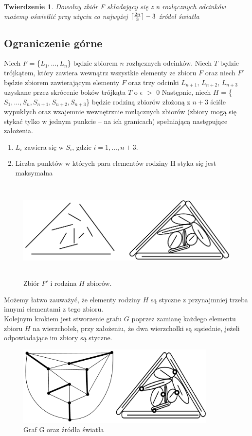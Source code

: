 \documentclass[brudnopis]{xmgr}
\DeclarePairedDelimiter\ceil{\lceil}{\rceil}
\newtheorem{Twierdzenie}{Twierdzenie} \theoremstyle{definition}
\begin{document}
\begin{Twierdzenie}
 Dowolny zbiór F składający się z n rozłącznych odcinków możemy oświetlić przy użyciu co najwyżej $\ceil{\frac{2n}{3}} - 3$ źródeł światła
\end{Twierdzenie}
\subsection{Ograniczenie górne}
\indent Niech $F$ = \{$L_1, \ldots, L_n$\} będzie zbiorem $n$ rozłącznych odcinków. Niech $T$ będzie trójkątem, który zawiera wewnątrz wszystkie elementy ze zbioru $F$ oraz niech $F'$ będzie zbiorem zawierającym elementy $F$ oraz trzy odcinki $L_{n+1}$, $L_{n+2}$, $L_{n+3}$ uzyskane przez skrócenie boków trójkąta $T$ o $\epsilon$ $>$ 0
Następnie, niech $H$ = \{$S_1,\ldots,S_n,S_{n+1},S_{n+2},S_{n+3}$\} będzie rodziną zbiorów złożoną z $n + 3$ ściśle wypukłych oraz wzajemnie wewnętrznie rozłącznych zbiorów (zbiory mogą się stykać tylko w jednym punkcie -- na ich granicach) spełniającą następujące założenia.
\begin{enumerate}
  \item $L_i$ zawiera się w $S_i$, gdzie $i = 1,\ldots,n+3$.
  \item Liczba punktów w których para elementów rodziny H styka się jest maksymalna
\end{enumerate}
\begin{figure}[ht!]
 \centering
  \includegraphics[height=5cm, width=13.5cm]{rysunki/podswietlenie.png}
  \caption{Zbiór $F'$ i rodzina $H$ zbiorów.}
\end{figure} 
Możemy łatwo zauważyć, że elementy rodziny $H$ są styczne z przynajmniej trzeba innymi elementami z tego zbioru. 
\\\indent Kolejnym krokiem jest stworzenie grafu $G$ poprzez zamianę każdego elementu zbioru $H$ na wierzchołek, przy założeniu, że dwa wierzchołki są sąsiednie, jeżeli odpowiadające im zbiory są styczne.
\begin{figure}[ht!]
 \centering
  \includegraphics[height=4cm]{rysunki/skojarzenia_zrodla_swiatla.png}
  \caption{Graf G oraz źródła światła}
\end{figure}
\end{document}
